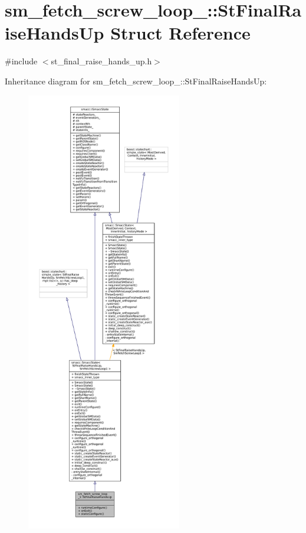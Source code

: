 \hypertarget{structsm__fetch__screw__loop__1_1_1StFinalRaiseHandsUp}{}\section{sm\+\_\+fetch\+\_\+screw\+\_\+loop\+\_\+:\+:St\+Final\+Raise\+Hands\+Up Struct Reference}
\label{structsm__fetch__screw__loop__1_1_1StFinalRaiseHandsUp}


{\ttfamily \#include $<$st\+\_\+final\+\_\+raise\+\_\+hands\+\_\+up.\+h$>$}



Inheritance diagram for sm\+\_\+fetch\+\_\+screw\+\_\+loop\+\_\+:\+:St\+Final\+Raise\+Hands\+Up\+:
\nopagebreak
\begin{figure}[H]
\begin{center}
\leavevmode
\includegraphics[height=550pt]{structsm__fetch__screw__loop__1_1_1StFinalRaiseHandsUp__inherit__graph}
\end{center}
\end{figure}


